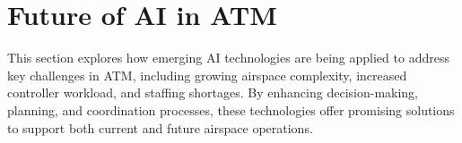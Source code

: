 \section{Future of AI in ATM}

This section explores how emerging \gls{AI} technologies are being applied to address key challenges in \gls{ATM}, including growing airspace complexity, increased controller workload, and staffing shortages. 
By enhancing decision-making, planning, and coordination processes, these technologies offer promising solutions to support both current and future airspace operations.




